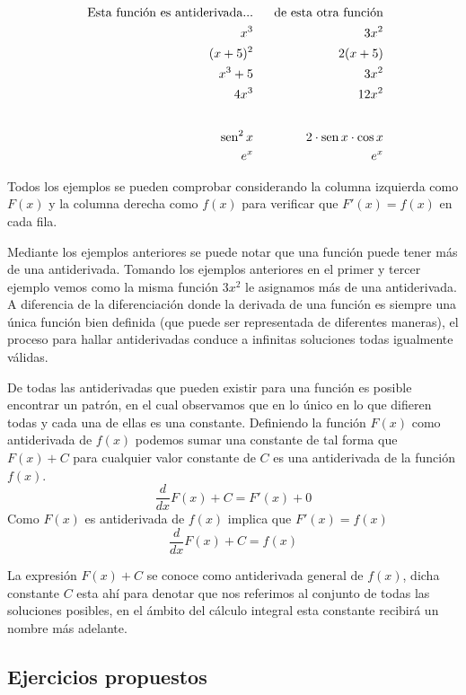 \documentclass[11pt,letterpaper,oneside]{book}
\numberwithin{equation}{section}
\newcommand{\der}[1][x]{\frac{d}{d#1} }
\begin{document}
	\begin{align*}
	\ \text{Esta función es antiderivada...}&  &\text{\ \ de esta otra función} \\
	\ x^3        			&	& 3x^2 \\
	\ (x+5)^2    			&	& 2(x+5) \\
	\ x^3 + 5   			&	& 3x^2 \\
	\ 4x^3     				 &   & 12x^2 \\
	\intertext{}
	\ \operatorname{sen}^2 x &  & 2\cdot \operatorname{sen}x \cdot \operatorname{cos} x \\
	\ e^x            &			& e^x
	\end{align*}
	\par
	Todos los ejemplos se pueden comprobar considerando la columna izquierda como $F(x)$ y la columna derecha como $f(x)$ para verificar que $F'(x)=f(x)$ en cada fila.
	\par 
	Mediante los ejemplos anteriores se puede notar que una función puede tener más de una antiderivada. Tomando los ejemplos anteriores en el primer y tercer ejemplo vemos como la misma función $3x^2$ le asignamos más de una antiderivada. A diferencia de la diferenciación donde la derivada de una función es siempre una única función bien definida (que puede ser representada de diferentes maneras), el proceso para hallar antiderivadas conduce a infinitas soluciones todas igualmente válidas.
	\par %
	De todas las antiderivadas que pueden existir para una función es posible encontrar un patrón, en el cual observamos que en lo único en lo que difieren todas y cada una de ellas es una constante. Definiendo la función $F(x)$ como antiderivada de $f(x)$ podemos sumar una constante de tal forma que $F(x)+C$ para cualquier valor constante de $C$ es una antiderivada de la función $f(x)$.
	\[ \der F(x)+C=F'(x)+0 \]
	Como $F(x)$ es antiderivada de $f(x)$ implica que $F'(x)=f(x)$
	\begin{equation}
	\der F(x)+C= f(x) \label{Ff}	
	\end{equation}
	\par %
	La expresión $F(x)+C$ se conoce como antiderivada general de $f(x)$, dicha constante $C$ esta ahí para denotar que nos referimos al conjunto de todas las soluciones posibles, en el ámbito del cálculo integral esta constante recibirá un nombre más adelante.
	
	\par
	\subsection{Ejercicios propuestos}
	
\end{document}
